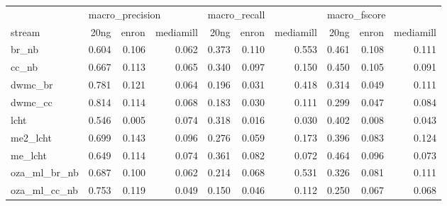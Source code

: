 \begin{tabular}{lrrrrrrrrr}
	\toprule
	                & \multicolumn{3}{l}{macro\_precision} & \multicolumn{3}{l}{macro\_recall} & \multicolumn{3}{l}{macro\_fscore}                                                         \\
	stream          & 20ng                                 & enron                             & mediamill                         & 20ng  & enron & mediamill & 20ng  & enron & mediamill \\
	\midrule
	br\_nb          & 0.604                                & 0.106                             & 0.062                             & 0.373 & 0.110 & 0.553     & 0.461 & 0.108 & 0.111     \\
	cc\_nb          & 0.667                                & 0.113                             & 0.065                             & 0.340 & 0.097 & 0.150     & 0.450 & 0.105 & 0.091     \\
	dwmc\_br        & 0.781                                & 0.121                             & 0.064                             & 0.196 & 0.031 & 0.418     & 0.314 & 0.049 & 0.111     \\
	dwmc\_cc        & 0.814                                & 0.114                             & 0.068                             & 0.183 & 0.030 & 0.111     & 0.299 & 0.047 & 0.084     \\
	lcht            & 0.546                                & 0.005                             & 0.074                             & 0.318 & 0.016 & 0.030     & 0.402 & 0.008 & 0.043     \\
	me2\_lcht       & 0.699                                & 0.143                             & 0.096                             & 0.276 & 0.059 & 0.173     & 0.396 & 0.083 & 0.124     \\
	me\_lcht        & 0.649                                & 0.114                             & 0.074                             & 0.361 & 0.082 & 0.072     & 0.464 & 0.096 & 0.073     \\
	oza\_ml\_br\_nb & 0.687                                & 0.100                             & 0.062                             & 0.214 & 0.068 & 0.531     & 0.326 & 0.081 & 0.111     \\
	oza\_ml\_cc\_nb & 0.753                                & 0.119                             & 0.049                             & 0.150 & 0.046 & 0.112     & 0.250 & 0.067 & 0.068     \\
	\bottomrule
\end{tabular}
